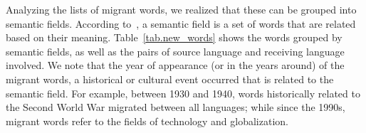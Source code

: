 \documentclass[10pt,letterpaper]{article} %
\begin{document}
Analyzing the lists  of 
migrant words, we realized that
these can be grouped into semantic fields. According to~\cite{semantic_oxford},
a semantic field is a set of words that are related based on their meaning.
Table~\ref{tab.new_words} shows the words grouped by semantic fields, as well as
the pairs of source language and receiving language involved. We note that the
year of appearance (or in the years around) of the migrant words, a historical
or cultural event occurred that is related to the semantic field. For example,
between 1930 and 1940, words historically related to the Second World War
migrated between all languages; while since the 1990s, migrant words refer
to the fields of technology and globalization.  
\end{document}
